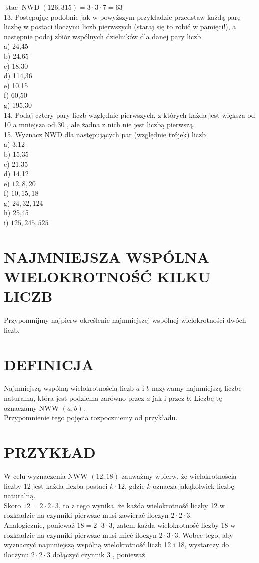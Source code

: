 \documentclass[10pt]{article}
\begin{document}
\(\operatorname{stac} \operatorname{NWD}(126,315)=3 \cdot 3 \cdot 7=63\)\\
13. Postępując podobnie jak w powyższym przykładzie przedstaw każdą parę liczbę w postaci iloczynu liczb pierwszych (staraj się to robić w pamięci!), a następnie podaj zbiór wspólnych dzielników dla danej pary liczb\\
a) 24,45\\
b) 24,65\\
c) 18,30\\
d) 114,36\\
e) 10,15\\
f) 60,50\\
g) 195,30\\
14. Podaj cztery pary liczb względnie pierwszych, z których każda jest większa od 10 a mniejsza od 30 , ale żadna z nich nie jest liczbą pierwszą.\\
15. Wyznacz NWD dla następujących par (względnie trójek) liczb\\
a) 3,12\\
b) 15,35\\
c) 21,35\\
d) 14,12\\
e) \(12,8,20\)\\
f) \(10,15,18\)\\
g) \(24,32,124\)\\
h) 25,45\\
i) \(125,245,525\)

\section*{NAJMNIEJSZA WSPÓLNA WIELOKROTNOŚĆ KILKU LICZB}
Przypomnijmy najpierw określenie najmniejszej wspólnej wielokrotności dwóch liczb.

\section*{DEFINICJA}
Najmniejszą wspólną wielokrotnością liczb \(a\) i \(b\) nazywamy najmniejszą liczbę naturalną, która jest podzielna zarówno przez \(a\) jak i przez \(b\). Liczbę tę oznaczamy NWW \((a, b)\).\\
Przypomnienie tego pojęcia rozpoczniemy od przykładu.

\section*{PRZYKŁAD}
W celu wyznaczenia NWW \((12,18)\) zauważmy wpierw, że wielokrotnością liczby 12 jest każda liczba postaci \(k \cdot 12\), gdzie \(k\) oznacza jakąkolwiek liczbę naturalną.\\
Skoro \(12=2 \cdot 2 \cdot 3\), to z tego wynika, że każda wielokrotność liczby 12 w rozkładzie na czynniki pierwsze musi zawierać iloczyn \(2 \cdot 2 \cdot 3\).\\
Analogicznie, ponieważ \(18=2 \cdot 3 \cdot 3\), zatem każda wielokrotność liczby 18 w rozkładzie na czynniki pierwsze musi mieć iloczyn \(2 \cdot 3 \cdot 3\). Wobec tego, aby wyznaczyć najmniejszą wspólną wielokrotność liczb 12 i 18, wystarczy do iloczynu \(2 \cdot 2 \cdot 3\) dołączyć czynnik 3 , ponieważ
\end{document}
